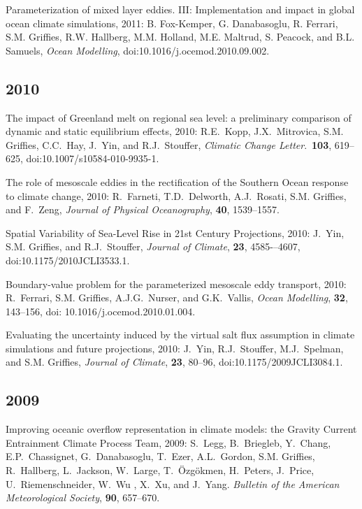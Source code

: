 \begin{etaremune}
\item Parameterization of mixed layer eddies. III: Implementation and impact in global ocean climate simulations, 2011: B. Fox-Kemper, G. Danabasoglu, R. Ferrari, S.M. Grif\/f\/ies, R.W. Hallberg, M.M. Holland, M.E. Maltrud, S. Peacock, and B.L. Samuels, {\it Ocean Modelling}, doi:10.1016/j.ocemod.2010.09.002.

\subsection*{\sc \color{Maroon} 2010}

\item The impact of Greenland melt on regional sea level: a preliminary comparison of dynamic and static equilibrium effects, 2010: R.E.\ Kopp, J.X.\ Mitrovica, S.M. Grif\/f\/ies, C.C.\  Hay, J.\ Yin, and R.J.\ Stouffer, {\it Climatic Change Letter}.\,
  {\bf 103}, 619--625, doi:10.1007/s10584-010-9935-1.

\item The role of mesoscale eddies in the rectification of the Southern Ocean response to climate change, 2010: R.\ Farneti, T.D.\  Delworth, A.J.\ Rosati, S.M. Grif\/f\/ies, and F.\ Zeng, {\it Journal of Physical Oceanography}, {\bf 40}, 1539--1557.

\item Spatial Variability of Sea-Level Rise in 21st Century Projections, 2010: J.\ Yin, S.M. Grif\/f\/ies, and R.J.\ Stouffer, {\it Journal of Climate}, {\bf 23}, 4585-–4607, doi:10.1175/2010JCLI3533.1.

\item Boundary-value problem for the parameterized mesoscale eddy transport, 2010: R.\ Ferrari, S.M. Grif\/f\/ies, A.J.G.\  Nurser, and G.K.\ Vallis, {\em Ocean Modelling}, {\bf 32}, 143--156, doi: 10.1016/j.ocemod.2010.01.004.

\item Evaluating the uncertainty induced by the virtual salt flux assumption in climate simulations and future projections, 2010: J.\  Yin, R.J.\ Stouffer, M.J.\ Spelman, and S.M. Grif\/f\/ies, {\em Journal of Climate}, {\bf 23}, 80--96, doi:10.1175/2009JCLI3084.1. 

\subsection*{\sc \color{Maroon} 2009}


\item Improving oceanic overflow representation in climate models: the   Gravity Current Entrainment Climate Process Team, 2009: S.\ Legg, B.\ Briegleb, Y.\ Chang, E.P.\ Chassignet, G.\ Danabasoglu, T.\ Ezer, A.L.\ Gordon, S.M. Grif\/f\/ies, R.\ Hallberg, L.\ Jackson, W.\ Large, T.\ \"Ozg\"okmen, H.\ Peters, J.\ Price, U.\
  Riemenschneider, W.\ Wu , X.\ Xu, and J.\ Yang.  {\em Bulletin of the American Meteorological Society}, {\bf 90}, 657--670.


\end{etaremune}
